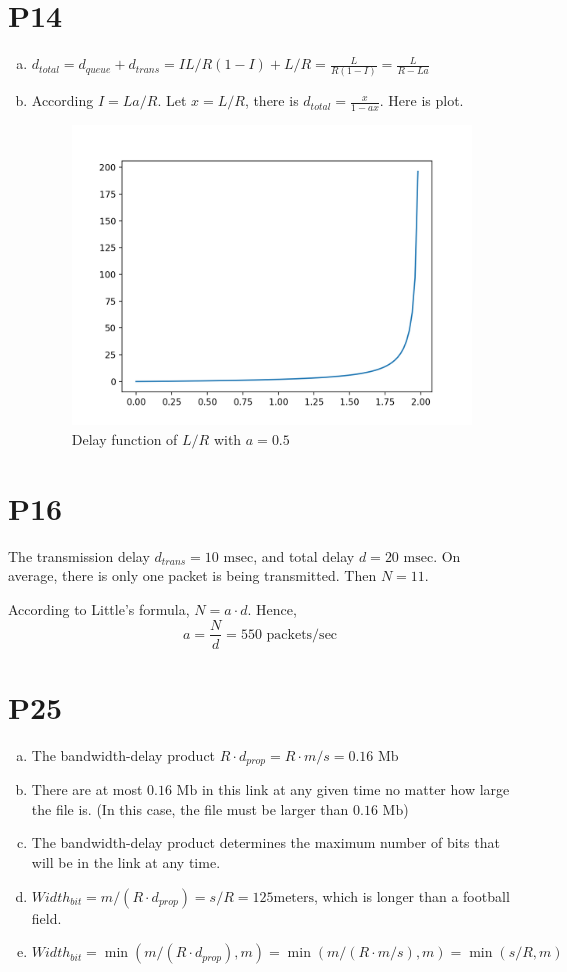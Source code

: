 \documentclass[a4paper, 11pt]{article}
\begin{document}
\section*{P14}
	\begin{enumerate}[a.]
		\item $d_{total} = d_{queue} + d_{trans} = IL/R(1-I) + L/R = \frac{L}{R(1-I)} = \frac{L}{R - La}$
		\item According $I = La / R$. Let $x = L / R$, there is $d_{total} = \frac{x}{1 - ax}$. Here is plot.
		\begin{figure}[H]
			\centering
			\includegraphics[width = 0.7 \linewidth] {Figure1}
			\caption{Delay function of $L / R$ with $a = 0.5$}
		\end{figure}
	\end{enumerate}
\section*{P16}
\hspace{14pt} The transmission delay $d_{trans} = 10 \text{ msec}$, and total delay $d = 20 \text{ msec}$. On average, there is only one packet is being transmitted. Then $N = 11$. 

According to Little's formula, $N = a \cdot d$. Hence, $$a = \frac{N}{d} = 550\text{ packets/sec}$$

\section*{P25}
	\begin{enumerate}[a.]
		\item The bandwidth-delay product $R \cdot d_{prop} = R \cdot m / s = 0.16\text{ Mb}$
		\item There are at most $0.16\text{ Mb}$ in this link at any given time no matter how large the file is. (In this case, the file must be larger than $0.16\text{ Mb}$)
		\item The bandwidth-delay product determines the maximum number of bits that will be in the link at any time.
		\item $Width_{bit} = m / (R \cdot d_{prop}) = s / R = 125 \text{meters}$, which is longer than a football field.
		\item $Width_{bit} = \min(m / (R \cdot d_{prop}), m) =  \min(m /(R \cdot m / s), m) = \min(s / R, m)$
	\end{enumerate}
\end{document}
